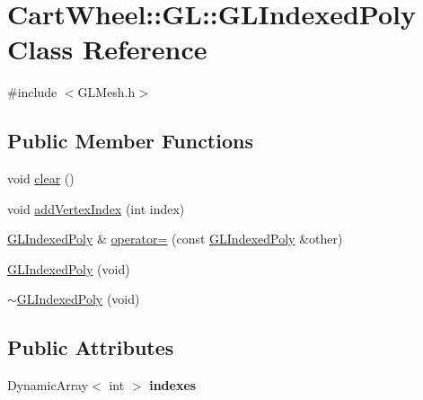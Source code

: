 \hypertarget{classCartWheel_1_1GL_1_1GLIndexedPoly}{
\section{CartWheel::GL::GLIndexedPoly Class Reference}
\label{classCartWheel_1_1GL_1_1GLIndexedPoly}
}


{\ttfamily \#include $<$GLMesh.h$>$}

\subsection*{Public Member Functions}
\begin{DoxyCompactItemize}
\item 
void \hyperlink{classCartWheel_1_1GL_1_1GLIndexedPoly_ac4a271b76b0b2c4776dd3d183af85190}{clear} ()
\item 
void \hyperlink{classCartWheel_1_1GL_1_1GLIndexedPoly_a4f38506cb27baebf57df07766bf32e53}{addVertexIndex} (int index)
\item 
\hyperlink{classCartWheel_1_1GL_1_1GLIndexedPoly}{GLIndexedPoly} \& \hyperlink{classCartWheel_1_1GL_1_1GLIndexedPoly_a7a698956ee71f181476218a08b121d65}{operator=} (const \hyperlink{classCartWheel_1_1GL_1_1GLIndexedPoly}{GLIndexedPoly} \&other)
\item 
\hyperlink{classCartWheel_1_1GL_1_1GLIndexedPoly_ad665def1b6752e27cab5c195b5101ed8}{GLIndexedPoly} (void)
\item 
\hyperlink{classCartWheel_1_1GL_1_1GLIndexedPoly_a89e44ede1407a525e8cfbb626e4b0fd9}{$\sim$GLIndexedPoly} (void)
\end{DoxyCompactItemize}
\subsection*{Public Attributes}
\begin{DoxyCompactItemize}
\item 
\hypertarget{classCartWheel_1_1GL_1_1GLIndexedPoly_a56caff7c1df9ee0f0551a6c684f2b7d7}{
DynamicArray$<$ int $>$ {\bfseries indexes}}
\label{classCartWheel_1_1GL_1_1GLIndexedPoly_a56caff7c1df9ee0f0551a6c684f2b7d7}

\end{DoxyCompactItemize}
